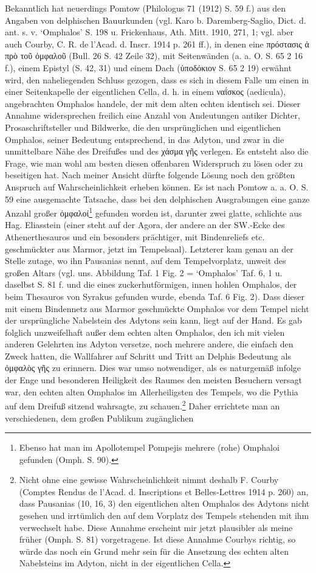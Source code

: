\documentclass[a4paper, 11pt, oneside]{article}
\begin{document}
Bekanntlich hat neuerdings Pomtow (Philologus 71 (1912) S. 59 f.) aus den Angaben von delphischen Bauurkunden (vgl. Karo b. Daremberg-Saglio, Dict. d. ant. s. v. `Omphalos' S. 198 u. Frickenhaus, Ath. Mitt. 1910, 271, 1; vgl. aber auch Courby, C. R. de l'Acad. d. Inscr. 1914 p. 261 ff.), in denen eine πρόστασις ἁ πρὸ τοῦ ὀμφαλοῦ (Bull. 26 S. 42 Zeile 32), mit Seitenwänden (a. a. O. S. 65 2 16 f.), einem Epistyl (S. 42, 31) und einem Dach (ὑποδόκιον S. 65 2 19) erwähnt wird, den naheliegenden Schluss gezogen, dass es sich in diesem Falle um einen in einer Seitenkapelle der eigentlichen Cella, d. h. in einem ναΐσκος (aedicula), angebrachten Omphalos handele, der mit dem alten echten identisch sei. Dieser Annahme widersprechen freilich eine Anzahl von Andeutungen antiker Dichter, Prosaschriftsteller und Bildwerke, die den ursprünglichen und eigentlichen Omphalos, seiner Bedeutung entsprechend, in das Adyton, und zwar in die unmittelbare Nähe des Dreifußes und des χάσμα γῆς verlegen. Es entsteht also die Frage, wie man wohl am besten diesen offenbaren Widerspruch zu lösen oder zu beseitigen hat. Nach meiner Ansicht dürfte folgende Lösung noch den größten Anspruch auf Wahrscheinlichkeit erheben können. Es ist nach Pomtow a. a. O. S. 59 eine ausgemachte Tatsache, dass bei den delphischen Ausgrabungen eine ganze Anzahl großer ὀμφαλοί\footnote{Ebenso hat man im Apollotempel Pompejis mehrere (rohe) Omphaloi gefunden (Omph. S. 90).} gefunden worden ist, darunter zwei glatte, schlichte aus Hag. Eliasstein (einer steht auf der Agora, der andere an der SW.-Ecke des Athenerthesauros und ein besonders prächtiger, mit Bindenreliefs etc. geschmückter aus Marmor, jetzt im Tempelsaal). Letzterer kam genau an der Stelle zutage, wo ihn Pausanias nennt, auf dem Tempelvorplatz, unweit des großen Altars (vgl. uns. Abbildung Taf. 1 Fig. 2 = `Omphalos' Taf. 6, 1 u. daselbst S. 81 f. und die eines zuckerhutförmigen, innen hohlen Omphalos, der beim Thesauros von Syrakus gefunden wurde, ebenda Taf. 6 Fig. 2). Dass dieser mit einem Bindennetz aus Marmor geschmückte Omphalos vor dem Tempel nicht der ursprüngliche Nabelstein des Adytons sein kann, liegt auf der Hand. Es gab folglich unzweifelhaft außer dem echten alten Omphalos, den ich mit vielen anderen Gelehrten ins Adyton versetze, noch mehrere andere, die einfach den Zweck hatten, die Wallfahrer auf Schritt und Tritt an Delphis Bedeutung als ὀμφαλὸς γῆς zu erinnern. Dies war umso notwendiger, als es naturgemäß infolge der Enge und besonderen Heiligkeit des Raumes den meisten Besuchern versagt war, den echten alten Omphalos im Allerheiligsten des Tempels, wo die Pythia auf dem Dreifuß sitzend wahrsagte, zu schauen.\footnote{Nicht ohne eine gewisse Wahrscheinlichkeit nimmt deshalb F. Courby (Comptes Rendus de l'Acad. d. Inscriptions et Belles-Lettres 1914 p. 260) an, dass Pausanias (10, 16, 3) den eigentlichen alten Omphalos des Adytons nicht gesehen und irrtümlich den auf dem Vorplatz des Tempels stehenden mit ihm verwechselt habe. Diese Annahme erscheint mir jetzt plausibler als meine früher (Omph. S. 81) vorgetragene. Ist diese Annahme Courbys richtig, so würde das noch ein Grund mehr sein für die Ansetzung des echten alten Nabelsteins im Adyton, nicht in der eigentlichen Cella.} Daher errichtete man an verschiedenen, dem großen Publikum zugänglichen 
\end{document}
